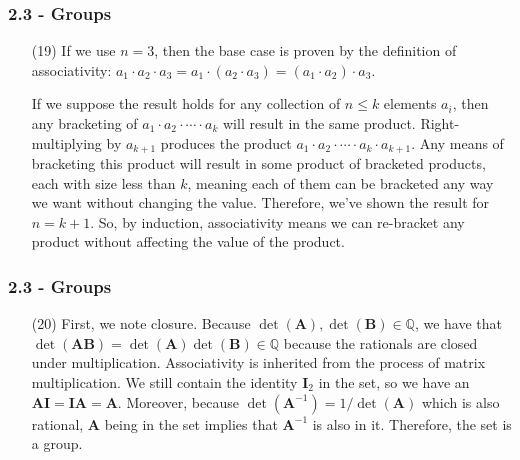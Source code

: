 \documentclass{beamer}
\begin{document}
\begin{frame}
\frametitle{2.3 - Groups}
\small
\begin{enumerate}
	\item[(19)] \quad If we use $n=3$, then the base case is proven by the definition of associativity: $a_1\cdot a_2\cdot a_3 = a_1\cdot(a_2\cdot a_3) = (a_1\cdot a_2)\cdot a_3$. 
	
	\quad If we suppose the result holds for any collection of  $n\leq k$ elements $a_i$, then any bracketing of $a_1\cdot a_2\cdot \cdots \cdot a_k$ will result in the same product. Right-multiplying by $a_{k+1}$ produces the product $a_1\cdot a_2\cdot \cdots\cdot a_k\cdot a_{k+1}$. Any means of bracketing this product will result in some product of bracketed products, each with size less than $k$, meaning each of them can be bracketed any way we want without changing the value. Therefore, we've shown the result for $n=k+1$. So, by induction, associativity means we can re-bracket any product without affecting the value of the product.
\end{enumerate}
\end{frame}
\begin{frame}
\frametitle{2.3 - Groups}
\small
\begin{enumerate}
	\item[(20)] First, we note closure. Because $\det(\mathbf A), \det(\mathbf B)\in\mathbb Q$, we have that $\det(\mathbf{AB}) = \det(\mathbf A)\det(\mathbf B)\in\mathbb Q$ because the rationals are closed under multiplication. Associativity is inherited from the process of matrix multiplication. We still contain the identity $\mathbf I_2$ in the set, so we have an $\mathbf{AI}=\mathbf{IA}=\mathbf A$. Moreover, because $\det(\mathbf A^{-1}) = 1 / \det(\mathbf A)$ which is also rational, $\mathbf A$ being in the set implies that $\mathbf A^{-1}$ is also in it. Therefore, the set is a group.
\end{enumerate}
\end{frame}
\end{document}
